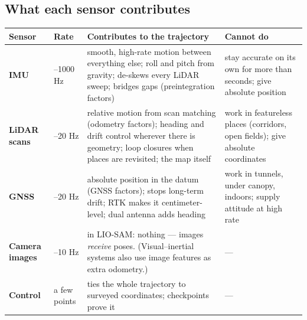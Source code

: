 \subsection*{What each sensor contributes}
\begin{center}\small
\renewcommand{\arraystretch}{1.25}
\begin{tabularx}{\linewidth}{>{\bfseries}p{2.0cm}>{\raggedright\arraybackslash}p{1.4cm}XX}\toprule
Sensor & Rate & Contributes to the trajectory & Cannot do\\\midrule
\color{teal}IMU & 100--1000 Hz & smooth, high-rate motion between everything else; roll and pitch from gravity; de-skews every LiDAR sweep; bridges gaps (preintegration factors) & stay accurate on its own for more than seconds; give absolute position\\
\color{orange}LiDAR scans & 10--20 Hz & relative motion from scan matching (odometry factors); heading and drift control wherever there is geometry; loop closures when places are revisited; the map itself & work in featureless places (corridors, open fields); give absolute coordinates\\
\color{gold}GNSS & 1--20 Hz & absolute position in the datum (GNSS factors); stops long-term drift; RTK makes it centimeter-level; dual antenna adds heading & work in tunnels, under canopy, indoors; supply attitude at high rate\\
\color{purple}Camera images & 1--10 Hz & in LIO-SAM: nothing --- images \emph{receive} poses. (Visual--inertial systems also use image features as extra odometry.) & ---\\
\textbf{Control} & a few points & ties the whole trajectory to surveyed coordinates; checkpoints prove it & ---\\\bottomrule
\end{tabularx}\end{center}



